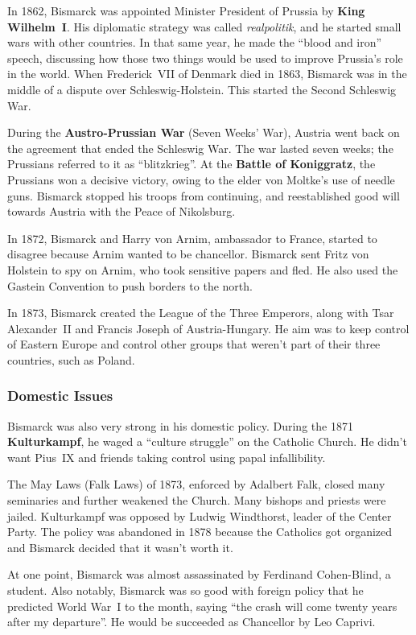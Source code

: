 In 1862, Bismarck was appointed Minister President of Prussia by \textbf{King Wilhelm~I}.
His diplomatic strategy was called \textit{realpolitik}, and he started small wars with other countries.
In that same year, he made the ``blood and iron'' speech,
discussing how those two things would be used to improve Prussia's role in the world.
When Frederick~VII of Denmark died in 1863, Bismarck was in the middle of a dispute over Schleswig-Holstein.
This started the Second Schleswig War.

During the \textbf{Austro-Prussian War} (Seven Weeks' War),
Austria went back on the agreement that ended the Schleswig War.
The war lasted seven weeks; the Prussians referred to it as ``blitzkrieg''.
At the \textbf{Battle of Koniggratz}, the Prussians won a decisive victory,
owing to the elder von Moltke's use of needle guns.
Bismarck stopped his troops from continuing,
and reestablished good will towards Austria with the Peace of Nikolsburg.

In 1872, Bismarck and Harry von Arnim, ambassador to France, started to disagree because Arnim wanted to be chancellor.
Bismarck sent Fritz von Holstein to spy on Arnim, who took sensitive papers and fled.
He also used the Gastein Convention to push borders to the north.

In 1873, Bismarck created the League of the Three Emperors,
along with Tsar Alexander~II and Francis Joseph of Austria-Hungary.
He aim was to keep control of Eastern Europe and control other groups that weren't part of their three countries,
such as Poland.

\subsubsection*{Domestic Issues}

Bismarck was also very strong in his domestic policy.
During the 1871 \textbf{Kulturkampf}, he waged a ``culture struggle'' on the Catholic Church.
He didn't want Pius~IX and friends taking control using papal infallibility.

The May Laws (Falk Laws) of 1873, enforced by Adalbert Falk, closed many seminaries and further weakened the Church.
Many bishops and priests were jailed.
Kulturkampf was opposed by Ludwig Windthorst, leader of the Center Party.
The policy was abandoned in 1878 because the Catholics got organized and Bismarck decided that it wasn't worth it.

At one point, Bismarck was almost assassinated by Ferdinand Cohen-Blind, a student.
Also notably, Bismarck was so good with foreign policy that he predicted World War~I to the month,
saying ``the crash will come twenty years after my departure''.
He would be succeeded as Chancellor by Leo Caprivi.

